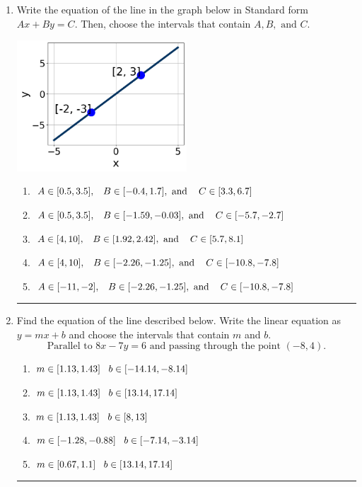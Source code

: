 \documentclass[14pt]{extbook}
\newcommand{\litem}[1]{\item#1\hspace*{-1cm}\rule{\textwidth}{0.4pt}}
\begin{document}
\begin{enumerate}
{\begin{enumerate}[label=\Alph*.]
\end{enumerate} }
\litem{
Write the equation of the line in the graph below in Standard form $Ax+By=C$. Then, choose the intervals that contain $A, B, \text{ and } C$.
\begin{center}
    \includegraphics[width=0.5\textwidth]{../Figures/linearGraphToStandardCopyB.png}
\end{center}
\begin{enumerate}[label=\Alph*.]
\item \( A \in [0.5, 3.5], \hspace{3mm} B \in [-0.4, 1.7], \text{ and } \hspace{3mm} C \in [3.3, 6.7] \)
\item \( A \in [0.5, 3.5], \hspace{3mm} B \in [-1.59, -0.03], \text{ and } \hspace{3mm} C \in [-5.7, -2.7] \)
\item \( A \in [4, 10], \hspace{3mm} B \in [1.92, 2.42], \text{ and } \hspace{3mm} C \in [5.7, 8.1] \)
\item \( A \in [4, 10], \hspace{3mm} B \in [-2.26, -1.25], \text{ and } \hspace{3mm} C \in [-10.8, -7.8] \)
\item \( A \in [-11, -2], \hspace{3mm} B \in [-2.26, -1.25], \text{ and } \hspace{3mm} C \in [-10.8, -7.8] \)

\end{enumerate} }
\litem{
Find the equation of the line described below. Write the linear equation as $ y=mx+b $ and choose the intervals that contain $m$ and $b$.\[ \text{Parallel to } 8 x - 7 y = 6 \text{ and passing through the point } (-8, 4). \]\begin{enumerate}[label=\Alph*.]
\item \( m \in [1.13, 1.43] \hspace*{3mm} b \in [-14.14, -8.14] \)
\item \( m \in [1.13, 1.43] \hspace*{3mm} b \in [13.14, 17.14] \)
\item \( m \in [1.13, 1.43] \hspace*{3mm} b \in [8, 13] \)
\item \( m \in [-1.28, -0.88] \hspace*{3mm} b \in [-7.14, -3.14] \)
\item \( m \in [0.67, 1.1] \hspace*{3mm} b \in [13.14, 17.14] \)


\end{enumerate}}
\end{enumerate}
\end{document}
